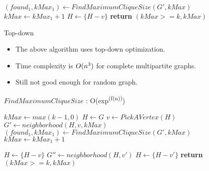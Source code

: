 \documentclass[landscape]{slides}
\begin{document}
\begin{algorithm}
	\begin{algorithmic}[1]
				\State $(found_1, kMax_1) \gets FindMaximumCliqueSize(G', kMax)$
				\State $kMax \gets kMax_1 + 1$
			\EndIf
		\EndIf
		\State $H \gets \{H - v\}$
		\EndWhile
		\State \textbf{return} $(kMax >= k, kMax)$
		\EndFunction
	\end{algorithmic}
\end{algorithm}

\clearpage
\begin{slide}
	\begin{center}{\large Top-down }\end{center}
	\begin{itemize}
		\setlength{\itemsep}{0pt}
		\setlength{\parskip}{20pt}
		\setlength{\parsep}{0pt}
		\item The above algorithm uses top-down optimization.
		\item Time complexity is $O(n\textsuperscript{3})$ for complete multipartite graphs.
		\item Still not good enough for random graph.
	\end{itemize}
\end{slide}


\begin{algorithm}
	\caption{$FindMaximumCliqueSize$ : O(exp\textsuperscript{(f(n))})}
	\begin{algorithmic}[1]
		\State $kMax \gets max(k - 1, 0)$
		\State $H \gets G$
			\State $v \gets PickAVertex(H)$
			\State $G' \gets neighborhood(H, v, kMax)$
				\State $(found_1, kMax_1) \gets FindMaximumCliqueSize(G', kMax)$
					\State $kMax \gets kMax_1 + 1$
				\EndIf
			\EndIf
	\end{algorithmic}
\end{algorithm}


\begin{algorithm}
	\begin{algorithmic}[1]
			\State $H \gets \{H - v\}$
			{\color{red}
				\State $G'' \gets neighborhood(H, v')$
					\State $H \gets \{H - v'\}$
				\EndIf
			\EndFor }
		\EndWhile
		\State \textbf{return} $(kMax >= k, kMax)$
		\EndFunction
	\end{algorithmic}
\end{algorithm}
\end{document}

